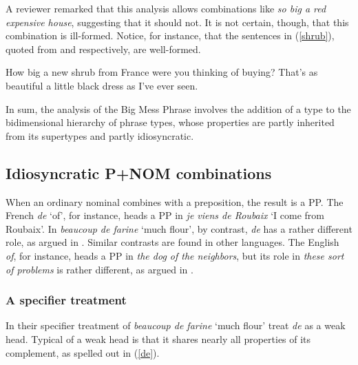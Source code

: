 \documentclass[output=paper
	        ,collection
	        ,collectionchapter
 	        ,biblatex
                ,babelshorthands
                ,newtxmath
                ,draftmode
                ,colorlinks, citecolor=brown
]{langscibook}
\begin{document}
A reviewer remarked that this analysis allows combinations like 
\emph{so big a red expensive house}, suggesting that it should not. 
It is not certain, though, that this combination is ill-formed.
Notice, for instance, that the sentences in (\ref{shrub}), 
quoted from \citet[116]{Zwicky95} and \citet[42]{Troseth09} respectively, 
are well-formed. 

\begin{exe} 
\ex\label{shrub} 
\begin{xlist} 
\ex  How big a new shrub from France were you thinking of buying? 
\ex  That's as beautiful a little black dress as I've ever seen.  
\end{xlist} 
\end{exe} 

In sum, the analysis of the Big Mess Phrase involves the addition of 
a type to the bidimensional hierarchy of phrase types, whose properties 
are partly inherited from its supertypes and partly idiosyncratic.      


\subsection{Idiosyncratic P+NOM combinations} 
\label{prep}


When an ordinary nominal combines with a preposition, the result is a PP. 
The French \emph{de} `of', for instance, heads a PP in 
\emph{je viens de Roubaix} `I come from Roubaix'. 
In \emph{beaucoup de farine} `much flour', by contrast, \emph{de} has 
a rather different role, as argued in \citet{Abeilleetal04}. 
Similar contrasts are found in other languages. The English \emph{of}, for instance, 
heads a PP in \emph{the dog of the neighbors}, but its role in \emph{these sort of problems} 
is rather different, as argued in \citet{Maekawa15}.  


\subsubsection{A specifier treatment} 


In their specifier treatment of \emph{beaucoup de farine} `much flour'  
\citet{Abeilleetal04} treat \emph{de} as a weak head. 
Typical of a weak head is that it shares 
nearly all properties of its complement, as spelled out in (\ref{de}).
\end{document}

